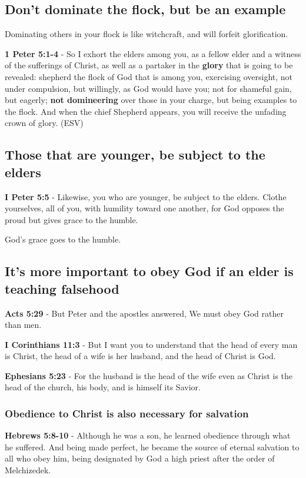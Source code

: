 \documentclass[11pt]{article}
\begin{document}
\subsection{Don't dominate the flock, but be an example}
\label{sec:orgd172c42}
Dominating others in your flock is like witchcraft, and will forfeit glorification.

\textbf{1 Peter 5:1-4} - So I exhort the elders among you, as a fellow elder and a witness of the sufferings of Christ, as well as a partaker in the \textbf{glory} that is going to be revealed: shepherd the flock of God that is among you, exercising oversight, not under compulsion, but willingly, as God would have you; not for shameful gain, but eagerly; \textbf{not domineering} over those in your charge, but being examples to the flock. And when the chief Shepherd appears, you will receive the unfading crown of glory. (ESV)

\subsection{Those that are younger, be subject to the elders}
\label{sec:orgfbcff5e}
\textbf{I Peter 5:5} - Likewise, you who are younger, be subject to the elders. Clothe yourselves, all of you, with humility toward one another, for God opposes the proud but gives grace to the humble.

God's grace goes to the humble.

\subsection{It's more important to obey God if an elder is teaching falsehood}
\label{sec:orga2360e4}
\textbf{Acts 5:29} - But Peter and the apostles answered, We must obey God rather than men.

\textbf{I Corinthians 11:3} - But I want you to understand that the head of every man is Christ, the head of a wife is her husband, and the head of Christ is God.

\textbf{Ephesians 5:23} - For the husband is the head of the wife even as Christ is the head of the church, his body, and is himself its Savior.

\subsubsection{Obedience to Christ is also necessary for salvation}
\label{sec:org9a0761f}
\textbf{Hebrews 5:8-10} - Although he was a son, he learned obedience through what he suffered. And being made perfect, he became the source of eternal salvation to all who obey him, being designated by God a high priest after the order of Melchizedek.
\end{document}
